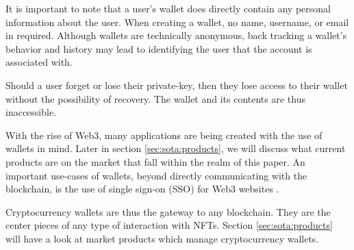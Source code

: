It is important to note that a user's wallet does directly contain any personal information about the user. When creating a wallet, no name, username, or email in required. Although wallets are technically anonymous, back tracking a wallet's behavior and history may lead to identifying the user that the account is associated with.

Should a user forget or lose their private-key, then they lose access to their wallet without the possibility of recovery. The wallet and its contents are thus inaccessible. \cite{wallets2}

With the rise of Web3, many applications are being created with the use of wallets in mind. Later in section \ref{sec:sota:products}, we will discuss what current products are on the market that fall within the realm of this paper. An important use-cases of wallets, beyond directly communicating with the blockchain, is the use of single sign-on (SSO) for Web3 websites \cite{walletConnect}.

Cryptocurrency wallets are thus the gateway to any blockchain. They are the center pieces of any type of interaction with NFTs. Section \ref{sec:sota:products} will have a look at market products which manage cryptocurrency wallets.







